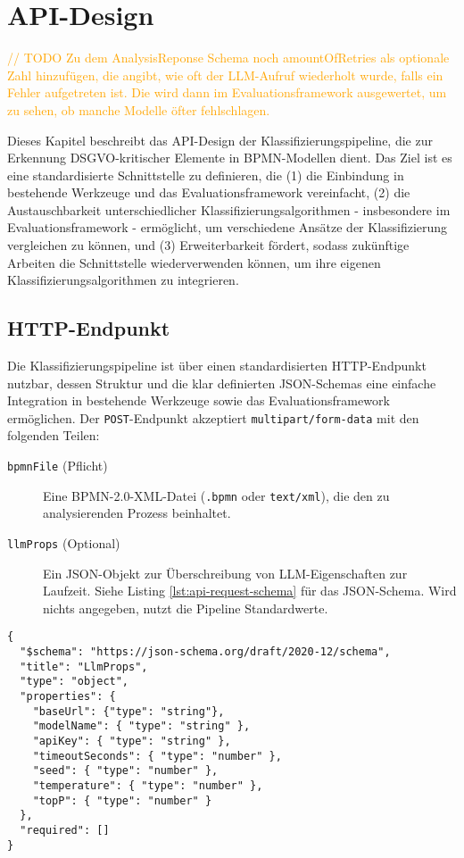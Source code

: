 \section{API-Design}\label{sec:api-design}

\textcolor{orange}{// TODO Zu dem AnalysisReponse Schema noch amountOfRetries als optionale Zahl hinzufügen, die angibt, wie oft der LLM-Aufruf wiederholt wurde, falls ein Fehler aufgetreten ist. Die wird dann im Evaluationsframework ausgewertet, um zu sehen, ob manche Modelle öfter fehlschlagen.}

Dieses Kapitel beschreibt das API-Design der Klassifizierungspipeline, die zur Erkennung \ac{DSGVO}-kritischer Elemente in \ac{BPMN}-Modellen dient. Das Ziel ist es eine standardisierte Schnittstelle zu definieren, die (1) die Einbindung in bestehende Werkzeuge und das Evaluationsframework vereinfacht, (2) die Austauschbarkeit unterschiedlicher Klassifizierungsalgorithmen - insbesondere im Evaluationsframework - ermöglicht, um verschiedene Ansätze der Klassifizierung vergleichen zu können, und (3) Erweiterbarkeit fördert, sodass zukünftige Arbeiten die Schnittstelle wiederverwenden können, um ihre eigenen Klassifizierungsalgorithmen zu integrieren.

\subsection*{HTTP-Endpunkt}

Die Klassifizierungspipeline ist über einen standardisierten HTTP-Endpunkt nutzbar, dessen Struktur und die klar definierten JSON-Schemas eine einfache Integration in bestehende Werkzeuge sowie das Evaluationsframework ermöglichen. Der \texttt{POST}-Endpunkt akzeptiert \texttt{multipart/form-data} mit den folgenden Teilen:

\begin{description}
    \item[\texttt{bpmnFile} (Pflicht)] Eine BPMN-2.0-XML-Datei (\texttt{.bpmn} oder \texttt{text/xml}), die den zu analysierenden Prozess beinhaltet.
    \item[\texttt{llmProps} (Optional)] Ein JSON-Objekt zur Überschreibung von \ac{LLM}-Eigenschaften zur Laufzeit. Siehe Listing \ref{lst:api-request-schema} für das JSON-Schema. Wird nichts angegeben, nutzt die Pipeline Standardwerte.
\end{description}

\begin{lstlisting}[caption={JSON-Schema der \texttt{llmProps}.},label={lst:api-request-schema}]
{
  "$schema": "https://json-schema.org/draft/2020-12/schema",
  "title": "LlmProps",
  "type": "object",
  "properties": {
    "baseUrl": {"type": "string"},
    "modelName": { "type": "string" },
    "apiKey": { "type": "string" },
    "timeoutSeconds": { "type": "number" },
    "seed": { "type": "number" },
    "temperature": { "type": "number" },
    "topP": { "type": "number" }
  },
  "required": []
}
\end{lstlisting}

